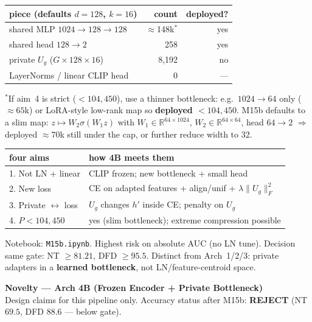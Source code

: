 \documentclass[11pt]{article}
\begin{document}
\vspace{6mm}
\begin{center}
\small
\begin{tabular}{L{60mm}rr}
\toprule
piece (defaults $d{=}128$, $k{=}16$) & count & deployed? \\
\midrule
shared MLP $1024{\to}128{\to}128$ & $\approx$148k$^*$ & yes \\
shared head $128{\to}2$ & 258 & yes \\
private $U_g$ ($G{\times}128{\times}16$) & 8{,}192 & no \\
LayerNorms / linear CLIP head & 0 & --- \\
\bottomrule
\end{tabular}
\end{center}
{\small $^*$If aim~4 is strict ($\lt104{,}450$), use a thinner bottleneck: e.g.\ $1024{\to}64$ only ($\approx65$k) or LoRA-style low-rank map so \textbf{deployed $\lt104{,}450$}. M15b defaults to a slim map: $z\mapsto W_2\sigma(W_1 z)$ with $W_1\in\mathbb{R}^{64\times1024}$, $W_2\in\mathbb{R}^{64\times64}$, head $64{\to}2$ $\Rightarrow$ deployed $\approx70$k still under the cap, or further reduce width to 32.}

\vspace{4mm}
\begin{center}
\small
\begin{tabular}{L{55mm}L{120mm}}
\toprule
four aims & how 4B meets them \\
. Not LN + linear & CLIP frozen; new bottleneck + small head \\
2. New loss & CE on adapted features + align/unif + $\lambda\|U_g\|_F^2$ \\
3. Private $\leftrightarrow$ loss & $U_g$ changes $h'$ inside CE; penalty on $U_g$ \\
4. $P\lt104{,}450$ & yes (slim bottleneck); extreme compression possible \\
\bottomrule
\end{tabular}
\end{center}

\vfill
{\small Notebook: \texttt{M15b.ipynb}. Highest risk on absolute AUC (no LN tune). Decision same gate: NT $\ge81.21$, DFD $\ge95.5$. Distinct from Arch~1/2/3: private adapters in a \textbf{learned bottleneck}, not LN/feature-centroid space.}

\newpage
\begin{center}
{\Large\bfseries Novelty --- Arch 4B (Frozen Encoder + Private Bottleneck)}\\[2pt]
{\small Design claims for this pipeline only. Accuracy status after M15b: \textbf{REJECT} (NT $69.5$, DFD $88.6$ --- below gate).}
\end{center}
\vspace{4mm}
\end{document}
